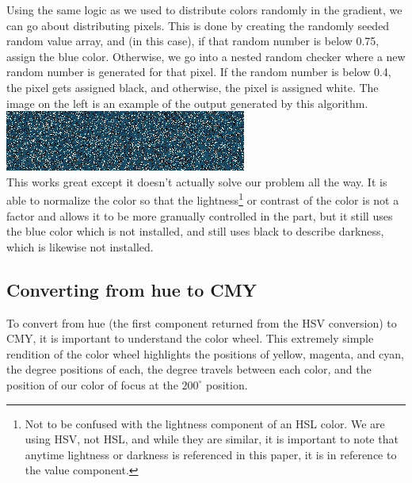 \documentclass{article}
\begin{document}
\begin{multicols}{2}
\begin{tikzpicture}[x=0.75pt,y=0.75pt,yscale=-1.5,xscale=3.25]
\end{tikzpicture}

\noindent
Using the same logic as we used to distribute colors randomly in the gradient, we can go about distributing pixels. This is done by creating the randomly seeded random value array, and (in this case), if that random number is below 0.75, assign the blue color. Otherwise, we go into a nested random checker where a new random number is generated for that pixel. If the random number is below 0.4, the pixel gets assigned black, and otherwise, the pixel is assigned white. The image on the left is an example of the output generated by this algorithm.
\\


\noindent
\includegraphics[width=\columnwidth]{objective-color-hsv-no-color-seperation}
\\

\noindent
This works great except it doesn't actually solve our problem all the way. It is able to normalize the color so that the lightness\footnote{Not to be confused with the lightness component of an HSL color. We are using HSV, not HSL, and while they are similar, it is important to note that anytime lightness or darkness is referenced in this paper, it is in reference to the value component.} or contrast of the color is not a factor and allows it to be more granually controlled in the part, but it still uses the blue color which is not installed, and still uses black to describe darkness, which is likewise not installed. 

\subsection{Converting from hue to CMY}

To convert from hue (the first component returned from the HSV conversion) to CMY, it is important to understand the color wheel. This extremely simple rendition of the color wheel highlights the positions of yellow, magenta, and cyan, the degree positions of each, the degree travels between each color, and the position of our color of focus at the $200^\circ$ position. 
\\


\end{multicols}
\end{document}
